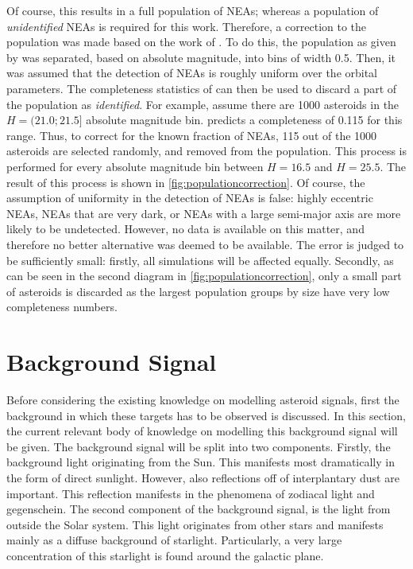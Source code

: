 Of course, this results in a full population of NEAs; whereas a population of \textit{unidentified} NEAs is required for this work. Therefore, a correction to the population was made based on the work of \cite{HarrisPopulation}. To do this, the population as given by \cite{GranvikPopulation} was separated, based on absolute magnitude, into bins of width 0.5. Then, it was assumed that the detection of NEAs is roughly uniform over the orbital parameters. The completeness statistics of \cite{HarrisPopulation} can then be used to discard a part of the population as \textit{identified}. For example, assume there are 1000 asteroids in the $H=(21.0; 21.5]$ absolute magnitude bin. \cite{HarrisPopulation} predicts a completeness of 0.115 for this range. Thus, to correct for the known fraction of NEAs, 115 out of the 1000 asteroids are selected randomly, and removed from the population. This process is performed for every absolute magnitude bin between $H=16.5$ and $H=25.5$. The result of this process is shown in \autoref{fig:populationcorrection}. Of course, the assumption of uniformity in the detection of NEAs is false: highly eccentric NEAs, NEAs that are very dark, or NEAs with a large semi-major axis are more likely to be undetected. However, no data is available on this matter, and therefore no better alternative was deemed to be available. The error is judged to be sufficiently small: firstly, all simulations will be affected equally. Secondly, as can be seen in the second diagram in \autoref{fig:populationcorrection}, only a small part of asteroids is discarded as the largest population groups by size have very low completeness numbers.

\section{Background Signal}
\label{sec:modelling_background}
Before considering the existing knowledge on modelling asteroid signals, first the background in which these targets has to be observed is discussed. In this section, the current relevant body of knowledge on modelling this background signal will be given. The background signal will be split into two components. Firstly, the background light originating from the Sun. This manifests most dramatically in the form of direct sunlight. However, also reflections off of interplantary dust are important. This reflection manifests in the phenomena of zodiacal light and gegenschein. The second component of the background signal, is the light from outside the Solar system. This light originates from other stars and manifests mainly as a diffuse background of starlight. Particularly, a very large concentration of this starlight is found around the galactic plane. \\

